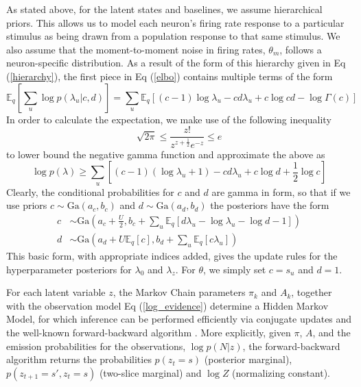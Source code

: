 \documentclass[10pt,letterpaper]{article}
\begin{document}
As stated above, for the latent states and baselines, we assume hierarchical priors. This allows us to model each neuron's firing rate response to a particular stimulus as being drawn from a population response to that same stimulus. We also assume that the moment-to-moment noise in firing rates, $\theta_m$, follows a neuron-specific distribution. As a result of the form of this hierarchy given in Eq (\ref{hierarchy}), the first piece in Eq (\ref{elbo}) contains multiple terms of the form
\begin{equation}
    \mathbb{E}_q \left[\sum_u \log p(\lambda_u|c, d)\right] = \sum_u \mathbb{E}_q \left[
    (c - 1) \log \lambda_u - cd\lambda_u + c \log cd - \log \Gamma(c)
    \right]
\end{equation}
In order to calculate the expectation, we make use of the following inequality \cite{abramowitz1964handbook}
\begin{equation}
    \sqrt{2\pi} \le \frac{z!}{z^{z+\frac{1}{2}} e^{-z}} \le e
\end{equation}
to lower bound the negative gamma function and approximate the above as
\begin{equation}
    \log p(\lambda) \ge \sum_u \left[
    (c - 1) (\log \lambda_u + 1) - cd\lambda_u + c \log d + \frac{1}{2}\log c\right]
\end{equation}
Clearly, the conditional probabilities for $c$ and $d$ are gamma in form, so that if we use priors $c \sim \text{Ga}(a_c, b_c)$ and $d\sim \text{Ga}(a_d, b_d)$ the posteriors have the form
\begin{align}
    c &\sim \text{Ga}\left(a_c + \frac{U}{2},
    b_c + \sum_u\mathbb{E}_q
        \left[d \lambda_u - \log \lambda_u - \log d - 1\right]\right) \\
    d &\sim \text{Ga}\left(
        a_d + U\mathbb{E}_q[c], b_d + \sum_u \mathbb{E}_q [c \lambda_u]
    \right)
\end{align}
This basic form, with appropriate indices added, gives the update rules for the hyperparameter posteriors for $\lambda_0$ and $\lambda_z$. For $\theta$, we simply set $c = s_u$ and $d = 1$.

For each latent variable $z$, the Markov Chain parameters $\pi_k$ and $A_k$, together with the observation model Eq (\ref{log_evidence}) determine a Hidden Markov Model, for which inference can be performed efficiently via conjugate updates and the well-known forward-backward algorithm \cite{beal2003variational}. More explicitly, given $\pi$, $A$, and the emission probabilities for the observations, $\log p(N|z)$, the forward-backward algorithm returns the probabilities $p(z_t=s)$ (posterior marginal), $p(z_{t+1} =s', z_t=s)$ (two-slice marginal) and $\log Z$ (normalizing constant).
\end{document}
